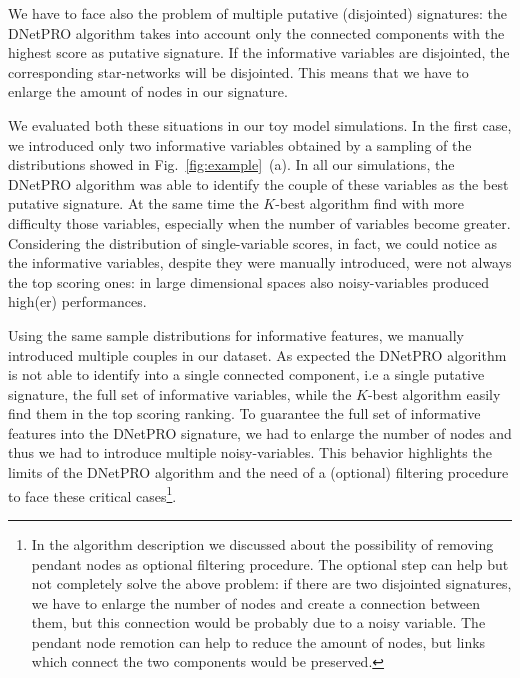 \documentclass{standalone}
\begin{document}
We have to face also the problem of multiple putative (disjointed) signatures: the \textsf{DNetPRO} algorithm takes into account only the connected components with the highest score as putative signature.
If the informative variables are disjointed, the corresponding star-networks will be disjointed.%
This means that we have to enlarge the amount of nodes in our signature.%

We evaluated both these situations in our toy model simulations.
In the first case, we introduced only two informative variables obtained by a sampling of the distributions showed in Fig.~\ref{fig:example}~(a).
In all our simulations, the \textsf{DNetPRO} algorithm was able to identify the couple of these variables as the best putative signature.
At the same time the $K$-best algorithm find with more difficulty those variables, especially when the number of variables become greater.
Considering the distribution of single-variable scores, in fact, we could notice as the informative variables, despite they were manually introduced, were not always the top scoring ones: in large dimensional spaces also noisy-variables produced high(er) performances.

Using the same sample distributions for informative features, we manually introduced multiple couples in our dataset.
As expected the \textsf{DNetPRO} algorithm is not able to identify into a single connected component, i.e a single putative signature, the full set of informative variables, while the $K$-best algorithm easily find them in the top scoring ranking.
To guarantee the full set of informative features into the \textsf{DNetPRO} signature, we had to enlarge the number of nodes and thus we had to introduce multiple noisy-variables.
This behavior highlights the limits of the \textsf{DNetPRO} algorithm and the need of a (optional) filtering procedure to face these critical cases\footnote{
  In the algorithm description we discussed about the possibility of removing pendant nodes as optional filtering procedure.
  The optional step can help but not completely solve the above problem: if there are two disjointed signatures, we have to enlarge the number of nodes and create a connection between them, but this connection would be probably due to a noisy variable.
  The pendant node remotion can help to reduce the amount of nodes, but links which connect the two components would be preserved.
}.

\end{document}
